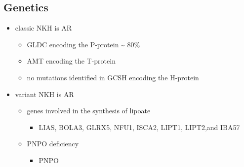\documentclass{scrartcl}
\begin{document}
\subsection{Genetics}
\label{sec:org4f76752}
\begin{itemize}
\item classic NKH is AR
\begin{itemize}
\item GLDC encoding the P-protein \textasciitilde{} 80\%
\item AMT encoding the T-protein
\item no mutations identified in GCSH encoding the H-protein
\end{itemize}
\item variant NKH is AR
\begin{itemize}
\item genes involved in the synthesis of lipoate
\begin{itemize}
\item LIAS, BOLA3, GLRX5, NFU1, ISCA2, LIPT1, LIPT2,and IBA57
\end{itemize}
\item PNPO deficiency
\begin{itemize}
\item PNPO
\end{itemize}
\end{itemize}
\end{itemize}
\end{document}
